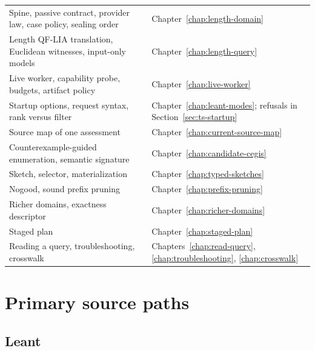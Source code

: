 \documentclass[10pt,letterpaper,oneside]{report}
\newcommand{\code}[1]{\texttt{\detokenize{#1}}}
\begin{document}
\begin{longtable}{@{}L{0.30\textwidth}L{0.64\textwidth}@{}}
Spine, passive contract, provider law, case policy, sealing order & Chapter~\ref{chap:length-domain} \\
Length QF-LIA translation, Euclidean witnesses, input-only models & Chapter~\ref{chap:length-query} \\
Live worker, capability probe, budgets, artifact policy & Chapter~\ref{chap:live-worker} \\
Startup options, \code{:synth} request syntax, rank versus filter & Chapter~\ref{chap:leant-modes}; refusals in Section~\ref{sec:ts-startup} \\
Source map of one assessment & Chapter~\ref{chap:current-source-map} \\
Counterexample-guided enumeration, semantic signature & Chapter~\ref{chap:candidate-cegis} \\
Sketch, selector, materialization & Chapter~\ref{chap:typed-sketches} \\
Nogood, sound prefix pruning & Chapter~\ref{chap:prefix-pruning} \\
Richer domains, exactness descriptor & Chapter~\ref{chap:richer-domains} \\
Staged plan & Chapter~\ref{chap:staged-plan} \\
Reading a query, troubleshooting, crosswalk & Chapters~\ref{chap:read-query}, \ref{chap:troubleshooting}, \ref{chap:crosswalk} \\
\end{longtable}

\section{Primary source paths}

\subsection{Leant}
\end{document}
